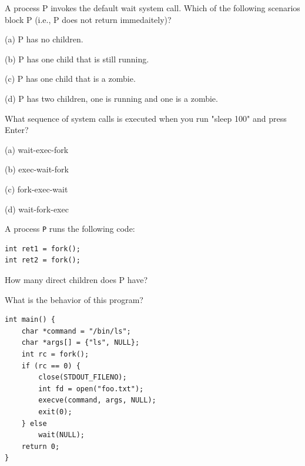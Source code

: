 \begin{slide}

    
    A process P invokes the default wait system call. Which of the following scenarios block P 
    (i.e., P does not return immedaitely)?
    \medskip
    
    (a) P has no children.
    \medskip
    
    (b) P has one child that is still running.
    \medskip
    
    (c) P has one child that is a zombie.
    \medskip
    
    (d) P has two children, one is running and one is a zombie.
    
\end{slide}

\begin{slide}

    
    What sequence of system calls is executed when you run "sleep 100" and press Enter?
    \medskip
    
    (a) wait-exec-fork
    \medskip
    
    (b) exec-wait-fork
    \medskip
    
    (c) fork-exec-wait
    \medskip
    
    (d) wait-fork-exec

\end{slide}

\begin{slide}

    
    A process \texttt{P} runs the following code:
    \medskip
    
    \begin{verbatim}
int ret1 = fork();
int ret2 = fork();
    \end{verbatim}
    
    How many direct children does P have?
    
\end{slide}

\begin{slide}


	What is the behavior of this program?
	
    \begin{verbatim}
int main() {
    char *command = "/bin/ls"; 
    char *args[] = {"ls", NULL};   
    int rc = fork(); 
    if (rc == 0) {
        close(STDOUT_FILENO);
        int fd = open("foo.txt");
        execve(command, args, NULL);
        exit(0);
    } else
        wait(NULL);
    return 0;
}
    \end{verbatim}

\end{slide}

